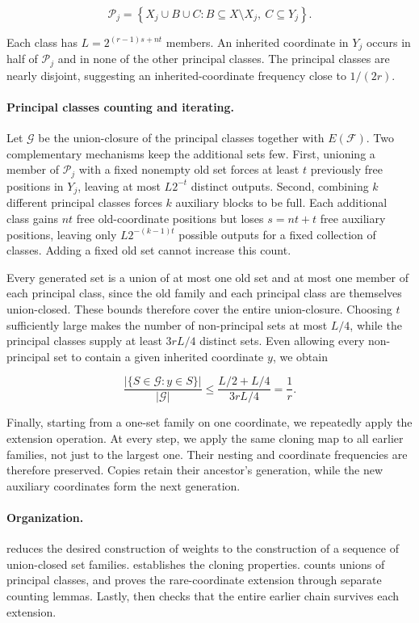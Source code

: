 \documentclass[11pt]{article}
\newcommand{\<}{\langle}
\renewcommand{\>}{\rangle}
\numberwithin{equation}{section}
\begin{document}
$$ \mathcal P_j= \left\{ X_j\cup B\cup C: B\subseteq X\setminus X_j,\ C\subseteq Y_j \right\}. $$

Each class has \(L=2^{(r-1)s+nt}\) members. An inherited coordinate in \(Y_j\) occurs in half of \(\mathcal P_j\) and in none of the other principal classes. The principal classes are nearly disjoint, suggesting an inherited-coordinate frequency close to \(1/(2r)\).

\paragraph{Principal classes counting and iterating.} Let \(\mathcal G\) be the union-closure of the principal classes together with \(E(\mathcal F)\). Two complementary mechanisms keep the additional sets few. First, unioning a member of \(\mathcal P_j\) with a fixed nonempty old set forces at least \(t\) previously free positions in \(Y_j\), leaving at most \(L2^{-t}\) distinct outputs. Second, combining \(k\) different principal classes forces \(k\) auxiliary blocks to be full. Each additional class gains \(nt\) free old-coordinate positions but loses \(s=nt+t\) free auxiliary positions, leaving only \(L2^{-(k-1)t}\) possible outputs for a fixed collection of classes. Adding a fixed old set cannot increase this count.

Every generated set is a union of at most one old set and at most one member of each principal class, since the old family and each principal class are themselves union-closed. These bounds therefore cover the entire union-closure. Choosing \(t\) sufficiently large makes the number of non-principal sets at most \(L/4\), while the principal classes supply at least \(3rL/4\) distinct sets. Even allowing every non-principal set to contain a given inherited coordinate \(y\), we obtain

$$ \frac{|\{S\in\mathcal G:y\in S\}|}{|\mathcal G|} \le \frac{L/2+L/4}{3rL/4} = \frac1r. $$

Finally, starting from a one-set family on one coordinate, we repeatedly apply the extension operation. At every step, we apply the same cloning map to all earlier families, not just to the largest one. Their nesting and coordinate frequencies are therefore preserved. Copies retain their ancestor’s generation, while the new auxiliary coordinates form the next generation.


\paragraph{Organization.}  reduces the desired construction of weights to the construction of a sequence of union-closed set families.  establishes the cloning properties.
 counts unions of principal classes, and
 proves the rare-coordinate extension through
separate counting lemmas. Lastly,  then checks that the
entire earlier chain survives each extension. 
\end{document}
